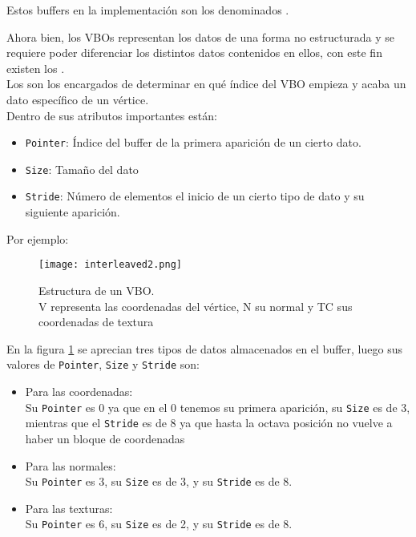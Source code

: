 Estos buffers en la implementación son los denominados \rorefbuffer.

Ahora bien, los VBOs representan los datos de una forma no estructurada y se requiere poder diferenciar los distintos datos contenidos en ellos, con este fin existen los \rorefbufferkey.\\
Los \rorefbufferkey son los encargados de determinar en qué índice del VBO empieza y acaba un dato específico de un vértice.\\
Dentro de sus atributos importantes están:
\begin{itemize}
\item \texttt{Pointer}: Índice del buffer de la primera aparición de un cierto dato.
\item \texttt{Size}: Tamaño del dato
\item \texttt{Stride}: Número de elementos el inicio de un cierto tipo de dato y su siguiente aparición.
\end{itemize}

Por ejemplo:\\
\begin{figure}[h!]
\begin{center}
\texttt{[image: interleaved2.png]}
\end{center}
\caption[Estructura de un VBO]{Estructura de un VBO.\\ V representa las coordenadas del vértice, N su normal y TC sus coordenadas de textura}
\label{interleaved2}
\end{figure}

En la figura \ref{interleaved2} se aprecian tres tipos de datos almacenados en el buffer, luego sus valores de \texttt{Pointer}, \texttt{Size} y \texttt{Stride} son:
\begin{itemize}
\item Para las coordenadas:\\
Su \texttt{Pointer} es 0 ya que en el 0 tenemos su primera aparición, su \texttt{Size} es de 3, mientras que el \texttt{Stride} es de 8 ya que hasta la octava posición no vuelve a haber un bloque de coordenadas

\item Para las normales:\\
Su \texttt{Pointer} es 3, su \texttt{Size} es de 3, y su \texttt{Stride} es de 8.

\item Para las texturas:\\
Su \texttt{Pointer} es 6, su \texttt{Size} es de 2, y su \texttt{Stride} es de 8.
\end{itemize}

